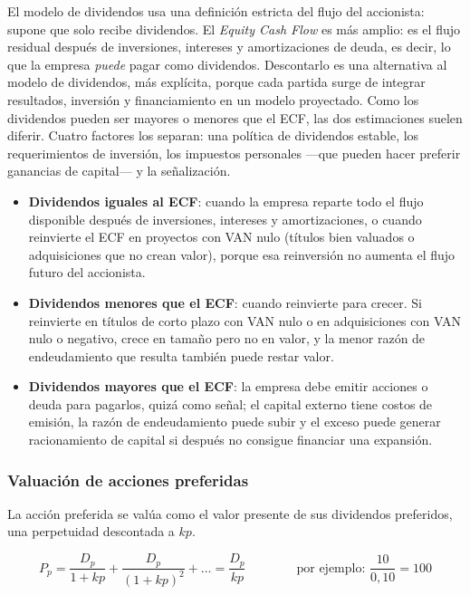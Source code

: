El modelo de dividendos usa una definición estricta del flujo del accionista: supone que solo recibe dividendos. El \emph{Equity Cash Flow}  es más amplio: es el flujo residual después de inversiones, intereses y amortizaciones de deuda, es decir, lo que la empresa \emph{puede} pagar como dividendos. Descontarlo es una alternativa al modelo de dividendos, más explícita, porque cada partida surge de integrar resultados, inversión y financiamiento en un modelo proyectado. Como los dividendos pueden ser mayores o menores que el ECF, las dos estimaciones suelen diferir. Cuatro factores los separan: una política de dividendos estable, los requerimientos de inversión, los impuestos personales —que pueden hacer preferir ganancias de capital— y la señalización.

\begin{itemize}
\item \textbf{Dividendos iguales al ECF}: cuando la empresa reparte todo el flujo disponible después de inversiones, intereses y amortizaciones, o cuando reinvierte el ECF en proyectos con VAN nulo (títulos bien valuados o adquisiciones que no crean valor), porque esa reinversión no aumenta el flujo futuro del accionista.
\item \textbf{Dividendos menores que el ECF}: cuando reinvierte para crecer. Si reinvierte en títulos de corto plazo con VAN nulo o en adquisiciones con VAN nulo o negativo, crece en tamaño pero no en valor, y la menor razón de endeudamiento que resulta también puede restar valor.
\item \textbf{Dividendos mayores que el ECF}: la empresa debe emitir acciones o deuda para pagarlos, quizá como señal; el capital externo tiene costos de emisión, la razón de endeudamiento puede subir y el exceso puede generar racionamiento de capital si después no consigue financiar una expansión.
\end{itemize}

\subsubsection{Valuación de acciones preferidas}

La acción preferida  se valúa como el valor presente de sus dividendos preferidos, una perpetuidad descontada a $kp$.

\begin{formulaBox}
\[
P_p = \frac{D_{p}}{1+kp} + \frac{D_{p}}{(1+kp)^{2}} + \dots = \frac{D_p}{kp}
\qquad\qquad\text{por ejemplo: } \frac{10}{0{,}10} = 100
\]
\end{formulaBox}

